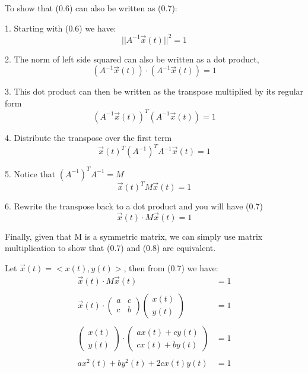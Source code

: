 \documentclass[12pt]{article}
\begin{document}
\vspace{0.5cm}

\noindent{}To show that (0.6) can also be written as (0.7):

1. Starting with (0.6) we have:
\[
    ||A^{-1}\vec{x}(t)||^{2}=1 \tag{0.6}
\]

2. The norm of left side squared can also be written as a dot product,
\[
    (A^{-1}\vec{x}(t)) \cdot{} (A^{-1}\vec{x}(t)) = 1
\]

3. This dot product can then be written as the transpose multiplied by its regular form
\[
    (A^{-1}\vec{x}(t))^T(A^{-1}\vec{x}(t)) = 1
\]

4. Distribute the transpose over the first term
\[
    \vec{x}(t)^T(A^{-1})^TA^{-1}\vec{x}(t) = 1
\]

5. Notice that $(A^{-1})^TA^{-1}  = M$
\[
    \vec{x}(t)^TM\vec{x}(t) = 1
\]

6. Rewrite the transpose back to a dot product and you will have (0.7)
\[
    \vec{x}(t)\cdot{}M\vec{x}(t) = 1 \tag{0.7}
\]

\vspace{0.5cm}

\noindent{}Finally, given that M is a symmetric matrix, we can simply use matrix multiplication to show that (0.7) and (0.8) are equivalent.

Let $\vec{x}(t) = <x(t), y(t)> $, then from (0.7) we have:
\begin{align*}
    \vec{x}(t)\cdot{}M\vec{x}(t)                                                                                  & = 1 \tag{0.7} \\\\
    \vec{x}(t) \cdot{} \begin{pmatrix} a & c \\ c & b \end{pmatrix} \begin{pmatrix} x(t) \\ y(t) \end{pmatrix}    & = 1           \\\\
    \begin{pmatrix} x(t) \\ y(t) \end{pmatrix} \cdot{} \begin{pmatrix} ax(t) + cy(t) \\ cx(t)+by(t) \end{pmatrix} & = 1           \\\\
    ax^2(t)+by^2(t)+2cx(t)y(t)                                                                                    & =1 \tag{0.8}
\end{align*}
\end{document}
